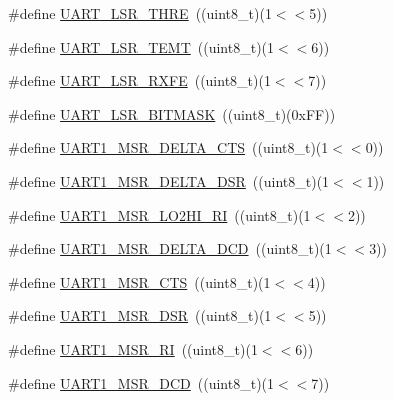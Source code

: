 \begin{DoxyCompactItemize}
\item 
\#define \hyperlink{group___u_a_r_t___private___macros_gae05118527ef8873b9d7b1b0be0153019}{\-U\-A\-R\-T\-\_\-\-L\-S\-R\-\_\-\-T\-H\-R\-E}~((uint8\-\_\-t)(1$<$$<$5))
\item 
\#define \hyperlink{group___u_a_r_t___private___macros_gadb3f8bb82f0a253700fdb88d8c609710}{\-U\-A\-R\-T\-\_\-\-L\-S\-R\-\_\-\-T\-E\-M\-T}~((uint8\-\_\-t)(1$<$$<$6))
\item 
\#define \hyperlink{group___u_a_r_t___private___macros_ga5972ac77db6249142b482356427dcf7c}{\-U\-A\-R\-T\-\_\-\-L\-S\-R\-\_\-\-R\-X\-F\-E}~((uint8\-\_\-t)(1$<$$<$7))
\item 
\#define \hyperlink{group___u_a_r_t___private___macros_ga3643d58e12f1d3bf342d140a5e3cb1ae}{\-U\-A\-R\-T\-\_\-\-L\-S\-R\-\_\-\-B\-I\-T\-M\-A\-S\-K}~((uint8\-\_\-t)(0x\-F\-F))
\item 
\#define \hyperlink{group___u_a_r_t___private___macros_ga2bb22876f02e34aa21bcd162cea55efb}{\-U\-A\-R\-T1\-\_\-\-M\-S\-R\-\_\-\-D\-E\-L\-T\-A\-\_\-\-C\-T\-S}~((uint8\-\_\-t)(1$<$$<$0))
\item 
\#define \hyperlink{group___u_a_r_t___private___macros_gac3d680cc21ada710ed81abb0ed9a1a4f}{\-U\-A\-R\-T1\-\_\-\-M\-S\-R\-\_\-\-D\-E\-L\-T\-A\-\_\-\-D\-S\-R}~((uint8\-\_\-t)(1$<$$<$1))
\item 
\#define \hyperlink{group___u_a_r_t___private___macros_ga36bbd609452b3c026fa804fcd13a86c0}{\-U\-A\-R\-T1\-\_\-\-M\-S\-R\-\_\-\-L\-O2\-H\-I\-\_\-\-R\-I}~((uint8\-\_\-t)(1$<$$<$2))
\item 
\#define \hyperlink{group___u_a_r_t___private___macros_ga8fb22a29caf2b5ca74022ea9f0a90185}{\-U\-A\-R\-T1\-\_\-\-M\-S\-R\-\_\-\-D\-E\-L\-T\-A\-\_\-\-D\-C\-D}~((uint8\-\_\-t)(1$<$$<$3))
\item 
\#define \hyperlink{group___u_a_r_t___private___macros_gae33cbb3bfc95dfa93e011c08057aa58c}{\-U\-A\-R\-T1\-\_\-\-M\-S\-R\-\_\-\-C\-T\-S}~((uint8\-\_\-t)(1$<$$<$4))
\item 
\#define \hyperlink{group___u_a_r_t___private___macros_ga30f158b6d377a4ce3720d4ce6864abd3}{\-U\-A\-R\-T1\-\_\-\-M\-S\-R\-\_\-\-D\-S\-R}~((uint8\-\_\-t)(1$<$$<$5))
\item 
\#define \hyperlink{group___u_a_r_t___private___macros_gad2a5a9572d8e00d40add31ca00264d74}{\-U\-A\-R\-T1\-\_\-\-M\-S\-R\-\_\-\-R\-I}~((uint8\-\_\-t)(1$<$$<$6))
\item 
\#define \hyperlink{group___u_a_r_t___private___macros_gad420620d318c71094a74ba44b1ce3483}{\-U\-A\-R\-T1\-\_\-\-M\-S\-R\-\_\-\-D\-C\-D}~((uint8\-\_\-t)(1$<$$<$7))
$$
\end{DoxyCompactItemize}
